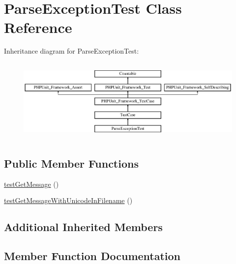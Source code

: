 \hypertarget{class_symfony_1_1_component_1_1_yaml_1_1_tests_1_1_parse_exception_test}{}\section{Parse\+Exception\+Test Class Reference}
\label{class_symfony_1_1_component_1_1_yaml_1_1_tests_1_1_parse_exception_test}
Inheritance diagram for Parse\+Exception\+Test\+:\begin{figure}[H]
\begin{center}
\leavevmode
\includegraphics[height=4.129793cm]{class_symfony_1_1_component_1_1_yaml_1_1_tests_1_1_parse_exception_test}
\end{center}
\end{figure}
\subsection*{Public Member Functions}
\begin{DoxyCompactItemize}
\item 
\mbox{\hyperlink{class_symfony_1_1_component_1_1_yaml_1_1_tests_1_1_parse_exception_test_a5451f391f98f4f595d278bee61e96db3}{test\+Get\+Message}} ()
\item 
\mbox{\hyperlink{class_symfony_1_1_component_1_1_yaml_1_1_tests_1_1_parse_exception_test_a45a550db228607903bb8017e1d88eb91}{test\+Get\+Message\+With\+Unicode\+In\+Filename}} ()
\end{DoxyCompactItemize}
\subsection*{Additional Inherited Members}


\subsection{Member Function Documentation}
\mbox{\label{class_symfony_1_1_component_1_1_yaml_1_1_tests_1_1_parse_exception_test_a5451f391f98f4f595d278bee61e96db3}} 
